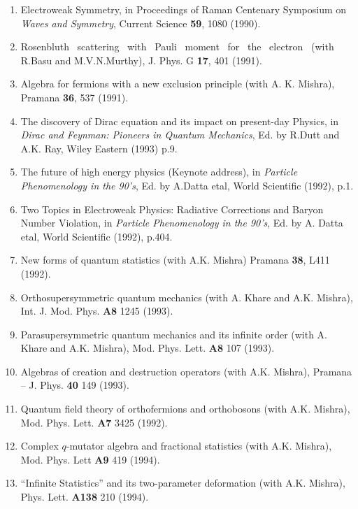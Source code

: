 \begin{enumerate}
\item Electroweak Symmetry, in Proceedings of Raman Centenary
Symposium on {\it Waves and Symmetry}, Current Science {\bf 59}, 1080
(1990).

\item Rosenbluth \ scattering \ with \ Pauli \ moment \ for \ the \
electron
\ (with R.Basu and M.V.N.Murthy), J. Phys. G {\bf 17}, 401 (1991).

\item Algebra for fermions with a new exclusion principle (with
A. K. Mishra), Pramana {\bf 36}, 537 (1991).

\item The discovery of Dirac equation and its impact on
present-day Physics, in {\it Dirac and Feynman: Pioneers in Quantum
Mechanics}, Ed. by R.Dutt and A.K. Ray, Wiley Eastern (1993) p.9.

\item The future of high energy physics (Keynote address), in
{\it Particle Phenomenology in the 90's}, Ed. by
A.Datta etal, World Scientific (1992), p.1.

\item Two Topics in Electroweak Physics: Radiative Corrections
and Baryon Number Violation, in {\it Particle Phenomenology in the
90's}, Ed. by A. Datta etal, World Scientific (1992), p.404.

\item New forms of quantum statistics (with A.K. Mishra) Pramana
{\bf 38}, L411 (1992).

\item Orthosupersymmetric quantum mechanics (with A. Khare and
A.K. Mishra), Int. J. Mod. Phys. {\bf A8} 1245 (1993).

\item Parasupersymmetric quantum mechanics and its infinite order
(with A. Khare and A.K. Mishra), Mod. Phys. Lett. {\bf A8} 107 (1993). 

\item Algebras of creation and destruction operators (with
A.K. Mishra), Pramana -- J. Phys. {\bf 40} 149 (1993).

\item Quantum field theory of orthofermions and orthobosons (with
A.K. Mishra), Mod. Phys. Lett. {\bf A7} 3425 (1992).

\item Complex $q$-mutator algebra and fractional statistics
(with A.K. Mishra), Mod. Phys. Lett {\bf A9} 419 (1994).

\item ``Infinite Statistics'' and its two-parameter deformation
(wi\-th A.K. Mishra), Phys. Lett. {\bf A138} 210 (1994).


\end{enumerate}

